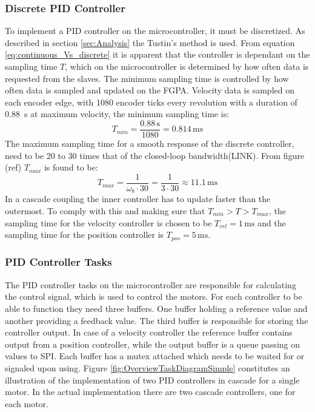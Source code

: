 \documentclass[../../main.tex]{subfiles}
\begin{document}
\subsubsection*{Discrete PID Controller}
To implement a PID controller on the microcontroller, it must be discretized. As described in section \ref{sec:Analysis} the Tustin's method is used.
From equation \ref{eq:continuous_Vs_discrete} it is apparent that the controller is dependant on the sampling time $T$, which on the microcontroller is determined by how often data is requested from the slaves. The minimum sampling time is controlled by how often data is sampled and updated on the FGPA. Velocity data is sampled on each encoder edge, with 1080 encoder ticks every revolution with a duration of \SI{0,88}{\second} \cite{} at maximum velocity, the minimum sampling time is:
\begin{equation}
    T_{min} = \frac{0.88\,\mathrm{s}}{1080} = 0.814\,\mathrm{ms}
\end{equation}
The maximum sampling time for a smooth response of the discrete controller, need to be 20 to 30 times that of the closed-loop bandwidth(LINK). From figure (ref) $T_{max}$ is found to be:
\begin{equation}
    T_{max} = \frac{1}{\omega_b\cdot 30} = \frac{1}{3 \cdot 30} \approx 11.1\,\mathrm{ms}
\end{equation}
In a cascade coupling the inner controller has to update faster than the outermost. To comply with this and making sure that $T_{min} > T > T_{max}$, the sampling time for the velocity controller is chosen to be $T_{vel} = 1\,\mathrm{ms}$ and the sampling time for the position controller is $T_{pos} = 5\,\mathrm{ms}$. \\

\subsubsection*{PID Controller Tasks}
The PID controller tasks on the microcontroller are responsible for calculating the control signal, which is used to control the motors. For each controller to be able to function they need three buffers. One buffer holding a reference value and another providing a feedback value. The third buffer is responsible for storing the controller output. In case of a velocity controller the reference buffer contains output from a position controller, while the output buffer is a queue passing on values to SPI. Each buffer has a mutex attached which needs to be waited for or signaled upon using. Figure \ref{fig:OverviewTaskDiagramSimple} constitutes an illustration of the implementation of two PID controllers in cascade for a single motor. In the actual implementation there are two cascade controllers, one for each motor.
\end{document}
